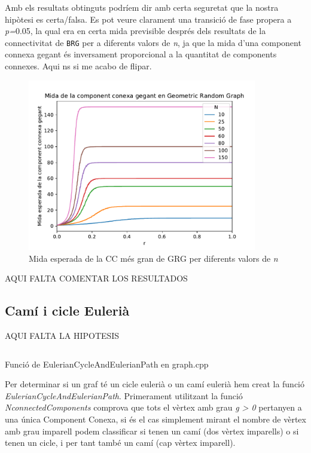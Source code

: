 Amb els resultats obtinguts podríem dir amb certa seguretat que la nostra hipòtesi es certa/falsa. Es pot veure clarament una transició de fase propera a \textit{p=}0.05, la qual era en certa mida previsible després dels resultats de la connectivitat de \texttt{BRG} per a diferents valors de \textit{n}, ja que la mida d'una component connexa gegant és inversament proporcional a la quantitat de components connexes. Aqui ns si me acabo de flipar.

\begin{figure}[H]
    \centering
    \includegraphics[width=10cm]{plots/GRG_midaCompConMax.pdf}
    \caption{Mida esperada de la CC més gran de GRG per diferents valors de \textit{n}}
    \label{fig:connect_04}
\end{figure}

AQUI FALTA COMENTAR LOS RESULTADOS

\subsection{Camí i cicle Eulerià}
AQUI FALTA LA HIPOTESIS

\begin{listing}
\inputminted[firstline=71,lastline=97]{cpp}{src/graph.cpp}
\caption{Funció de EulerianCycleAndEulerianPath en graph.cpp}
\end{listing}

Per determinar si un graf té un cicle eulerià o un camí eulerià hem creat la funció \textit{EulerianCycleAndEulerianPath}. Primerament utilitzant la funció \textit{NconnectedComponents} comprova que tots el vèrtex amb grau \textit{g > 0} pertanyen a una única Component Conexa, si és el cas simplement mirant el nombre de vèrtex amb grau imparell podem classificar si tenen un camí (dos vèrtex imparells) o si tenen un cicle, i per tant també un camí (cap vèrtex imparell).

